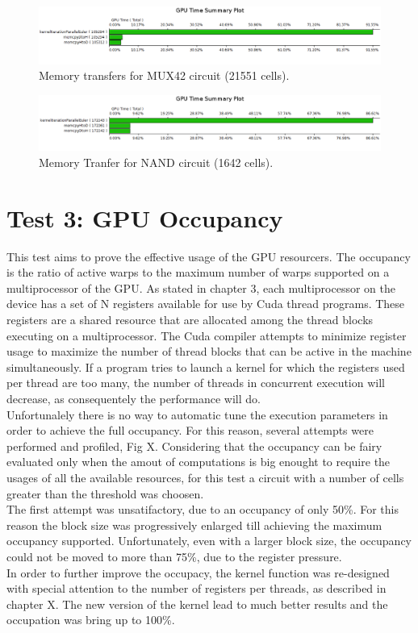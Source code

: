\begin{figure}[h!bt]
        \centerline{\includegraphics[width=\textwidth]{img/GPUTimeSummaryPlotMUX42.png}}
        \caption{Memory transfers for MUX42 circuit (21551 cells).}
        \label{fig:OccupancyAnalysis}
\end{figure}


\begin{figure}[h!bt]
        \centerline{\includegraphics[width=\textwidth]{img/GPUTimeSummaryPlotNAND.png}}
        \caption{Memory Tranfer for NAND circuit (1642 cells).}
        \label{fig:OccupancyAnalysis}
\end{figure}
   
\section{Test 3: GPU Occupancy}
This test aims to prove the effective usage of the GPU resourcers. The occupancy is the ratio of active warps to the maximum number of warps supported on a multiprocessor of the GPU. As stated in chapter 3, each multiprocessor on the device has a set of N registers available for use by Cuda thread programs. These registers are a shared resource that are allocated among the thread blocks executing on a multiprocessor. The Cuda compiler attempts to minimize register usage to maximize the number of thread blocks that can be active in the machine simultaneously. If a program tries to launch a kernel for which the registers used per thread are too many, the number of threads in concurrent execution will decrease, as consequentely the performance will do.\\
Unfortunalely there is no way to automatic tune the execution parameters in order to achieve the full occupancy. For this reason, several attempts were performed and profiled, Fig X. Considering that the occupancy can be fairy evaluated only when the amout of computations is big enought to require the usages of all the available resources, for this test a circuit with a number of cells greater than the threshold was choosen.\\ 
The first attempt was unsatifactory, due to an occupancy of only 50\%. For this reason the block size was progressively enlarged till achieving the maximum occupancy supported. Unfortunately, even with a larger block size, the occupancy could not be moved to more than 75\%, due to the register pressure.\\
In order to further improve the occupacy, the kernel function was re-designed with special attention to the number of registers per threads, as described in chapter X. The new version of the kernel lead to much better results and the occupation was bring up to 100\%.
    
